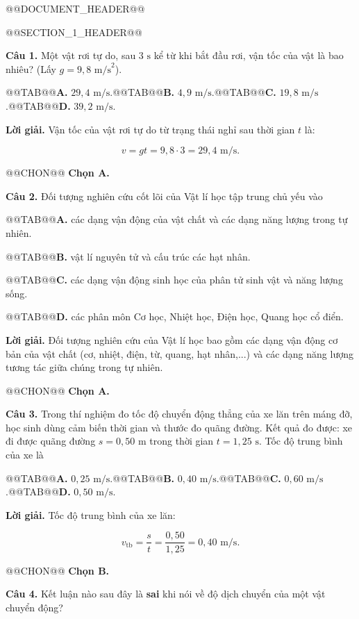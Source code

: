 \documentclass{article}
\begin{document}
@@DOCUMENT_HEADER@@

@@SECTION_1_HEADER@@

\textbf{Câu 1.} Một vật rơi tự do, sau $3\text{ s}$ kể từ khi bắt đầu rơi, vận tốc của vật là bao nhiêu? (Lấy $g = 9{,}8\text{ m/s}^2$).

@@TAB@@\textbf{A.} $29{,}4\text{ m/s}$.@@TAB@@\textbf{B.} $4{,}9\text{ m/s}$.@@TAB@@\textbf{C.} $19{,}8\text{ m/s}$.@@TAB@@\textbf{D.} $39{,}2\text{ m/s}$.

\textbf{Lời giải.} Vận tốc của vật rơi tự do từ trạng thái nghỉ sau thời gian $t$ là:

\[v = gt = 9{,}8 \cdot 3 = 29{,}4\text{ m/s}.\]

@@CHON@@ \textbf{Chọn A.}

\textbf{Câu 2.} Đối tượng nghiên cứu cốt lõi của Vật lí học tập trung chủ yếu vào

@@TAB@@\textbf{A.} các dạng vận động của vật chất và các dạng năng lượng trong tự nhiên.

@@TAB@@\textbf{B.} vật lí nguyên tử và cấu trúc các hạt nhân.

@@TAB@@\textbf{C.} các dạng vận động sinh học của phân tử sinh vật và năng lượng sống.

@@TAB@@\textbf{D.} các phân môn Cơ học, Nhiệt học, Điện học, Quang học cổ điển.

\textbf{Lời giải.} Đối tượng nghiên cứu của Vật lí học bao gồm các dạng vận động cơ bản của vật chất (cơ, nhiệt, điện, từ, quang, hạt nhân,...) và các dạng năng lượng tương tác giữa chúng trong tự nhiên.

@@CHON@@ \textbf{Chọn A.}

\textbf{Câu 3.} Trong thí nghiệm đo tốc độ chuyển động thẳng của xe lăn trên máng đỡ, học sinh dùng cảm biến thời gian và thước đo quãng đường. Kết quả đo được: xe đi được quãng đường $s = 0{,}50\text{ m}$ trong thời gian $t = 1{,}25\text{ s}$. Tốc độ trung bình của xe là

@@TAB@@\textbf{A.} $0{,}25\text{ m/s}$.@@TAB@@\textbf{B.} $0{,}40\text{ m/s}$.@@TAB@@\textbf{C.} $0{,}60\text{ m/s}$.@@TAB@@\textbf{D.} $0{,}50\text{ m/s}$.

\textbf{Lời giải.} Tốc độ trung bình của xe lăn:

\[v_{\text{tb}} = \frac{s}{t} = \frac{0{,}50}{1{,}25} = 0{,}40\text{ m/s}.\]

@@CHON@@ \textbf{Chọn B.}

\textbf{Câu 4.} Kết luận nào sau đây là \textbf{sai} khi nói về độ dịch chuyển của một vật chuyển động?
\end{document}
